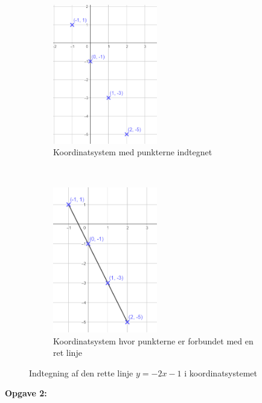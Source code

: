 \begin{figure}[ht]
    \centering
    \begin{subfigure}[t]{0.5\textwidth}
        \centering
        \includegraphics[width=0.5\textwidth]{img_3}
        \caption{Koordinatsystem med punkterne indtegnet}
    \end{subfigure}%
    ~ 
    \begin{subfigure}[t]{0.5\textwidth}
        \centering
        \includegraphics[width=0.5\textwidth]{img_4}
        \caption{Koordinatsystem hvor punkterne er forbundet med en ret linje}
    \end{subfigure}
    \caption{Indtegning af den rette linje $y = -2x -1 $ i koordinatsystemet}
\end{figure}

\textbf{Opgave 2:}

